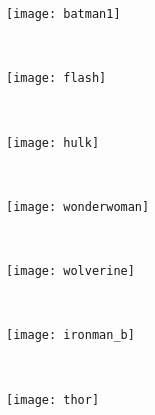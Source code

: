 \begin{figure}[!ht]
        
    \begin{subfigure}[b]{0.12\textwidth}
		\centering
		\texttt{[image: batman1]}	
	\end{subfigure}
	~ %
    \begin{subfigure}[b]{0.12\textwidth}
		\centering
		\texttt{[image: flash]}	
	\end{subfigure}
    ~ %
    \begin{subfigure}[b]{0.12\textwidth}
		\centering
		\texttt{[image: hulk]}	
	\end{subfigure}
	~ %
    \begin{subfigure}[b]{0.12\textwidth}
		\centering
		\texttt{[image: wonderwoman]}	
	\end{subfigure}
    ~ %
    \begin{subfigure}[b]{0.12\textwidth}
		\centering
		\texttt{[image: wolverine]}	
	\end{subfigure}
    ~ %
    \begin{subfigure}[b]{0.12\textwidth}
		\centering
		\texttt{[image: ironman\_b]}	
	\end{subfigure}
    ~ %
    \begin{subfigure}[b]{0.12\textwidth}
		\centering
		\texttt{[image: thor]}	
	\end{subfigure} \\[2ex]
    

\end{figure}
